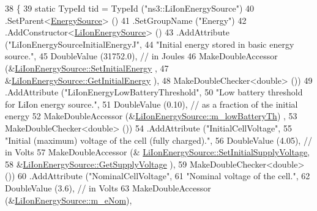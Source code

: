 \begin{DoxyCode}
38 \{
39   \textcolor{keyword}{static} TypeId tid = TypeId (\textcolor{stringliteral}{"ns3::LiIonEnergySource"})
40     .SetParent<\hyperlink{classns3_1_1EnergySource_a820794a417c3d2f7909f987ba6064cde}{EnergySource}> ()
41     .SetGroupName (\textcolor{stringliteral}{"Energy"})
42     .AddConstructor<\hyperlink{classns3_1_1LiIonEnergySource_a11429d9bb646cd2a080c08d56a14f524}{LiIonEnergySource}> ()
43     .AddAttribute (\textcolor{stringliteral}{"LiIonEnergySourceInitialEnergyJ"},
44                    \textcolor{stringliteral}{"Initial energy stored in basic energy source."},
45                    DoubleValue (31752.0),  \textcolor{comment}{// in Joules}
46                    MakeDoubleAccessor (&\hyperlink{classns3_1_1LiIonEnergySource_a1c08ea6e5f1239db8873d9ae2343a665}{LiIonEnergySource::SetInitialEnergy}
      ,
47                                        &\hyperlink{classns3_1_1LiIonEnergySource_a94b5b14c757a4679ea74fb402c954ff3}{LiIonEnergySource::GetInitialEnergy}
      ),
48                    MakeDoubleChecker<double> ())
49     .AddAttribute (\textcolor{stringliteral}{"LiIonEnergyLowBatteryThreshold"},
50                    \textcolor{stringliteral}{"Low battery threshold for LiIon energy source."},
51                    DoubleValue (0.10), \textcolor{comment}{// as a fraction of the initial energy}
52                    MakeDoubleAccessor (&\hyperlink{classns3_1_1LiIonEnergySource_a972d6f81d00be4fab50e1cb4fe057260}{LiIonEnergySource::m\_lowBatteryTh})
      ,
53                    MakeDoubleChecker<double> ())
54     .AddAttribute (\textcolor{stringliteral}{"InitialCellVoltage"},
55                    \textcolor{stringliteral}{"Initial (maximum) voltage of the cell (fully charged)."},
56                    DoubleValue (4.05), \textcolor{comment}{// in Volts}
57                    MakeDoubleAccessor (&
      \hyperlink{classns3_1_1LiIonEnergySource_a91887078ebf74c1df1ff3fb93227068b}{LiIonEnergySource::SetInitialSupplyVoltage},
58                                        &\hyperlink{classns3_1_1LiIonEnergySource_a48b2c773b3a8aaf1e95bccfa851ededb}{LiIonEnergySource::GetSupplyVoltage}
      ),
59                    MakeDoubleChecker<double> ())
60     .AddAttribute (\textcolor{stringliteral}{"NominalCellVoltage"},
61                    \textcolor{stringliteral}{"Nominal voltage of the cell."},
62                    DoubleValue (3.6),  \textcolor{comment}{// in Volts}
63                    MakeDoubleAccessor (&\hyperlink{classns3_1_1LiIonEnergySource_a95979850ba194e2492f911c2d6d39c19}{LiIonEnergySource::m\_eNom}),

\end{DoxyCode}
